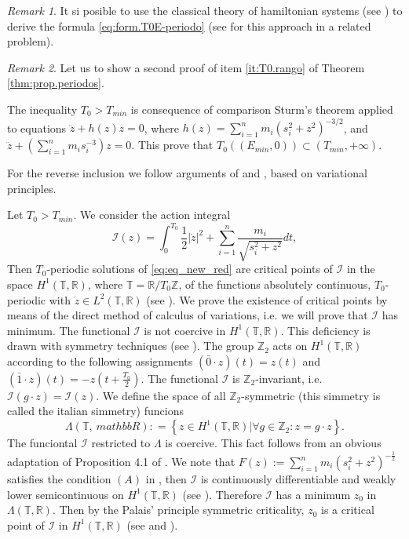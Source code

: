 \documentclass[twoside]{article}
\theoremstyle{remark}
\newtheorem{comentario}{Remark}
\newcommand{\rr}{\mathbb{R}}
\begin{document}
\begin{comentario}
 It si posible to use the classical theory of hamiltonian systems (see \cite{A}) to derive the formula \eqref{eq:form.T0E-periodo} (see \cite{acinas2014estimates} for this approach in a related problem).
\end{comentario}



\begin{comentario}
Let us to show a second proof of item \ref{it:T0.rango} of Theorem \ref{thm:prop.periodos}.

The inequality $T_0>T_{min}$ is consequence of comparison Sturm's theorem applied to equations  $\ddot{z}+h(z)z=0$, where $h(z)=\sum_{i=1}^{n} m_i \left(s_i^2 +z^2\right)^{-3/2}$, and $\ddot{z}+\left(\sum_{i=1}^{n} m_i s_i^{-3}\right)z=0$. This prove that $T_0\left((E_{min},0)\right)\subset(T_{min},+\infty)$.

For the reverse inclusion  we  follow arguments of \cite{zhao2015nonplanar} and \cite{li2013characterization}, based on variational principles.


Let $T_0>T_{min}$. We consider the action integral
\[\mathcal{I}(z)=\int_0^{T_0}\frac12|\dot{z}|^2+\sum_{i=1}^n\frac{m_i}{\sqrt{s_i^2+z^2}}dt,\]
Then $T_0$-periodic solutions of \eqref{eq:eq_new_red} are critical points of $\mathcal{I}$ in the space $H^1(\mathbb{T},\rr)$, where $\mathbb{T}=\rr/T_0\mathbb{Z}$, of the functions  absolutely continuous, $T_0$-periodic with $\dot{z}\in L^2(\mathbb{T},\rr)$ (see \cite[Cor. 1.1]{Mawhin2010}). We prove the existence of critical points by means of the direct method of calculus of variations, i.e. we will prove that $\mathcal{I}$ has minimum.  The functional $\mathcal{I}$ is not coercive in $H^1(\mathbb{T},\rr)$.  This deficiency is drawn with symmetry techniques (see \cite{David-2004}). The group $\mathbb{Z}_2$ acts on $H^1(\mathbb{T},\rr)$ according to the following assignments $(\bar{0}\cdot z)(t)=z(t)$ and $(\bar{1}\cdot z)(t)=-z(t+\frac{T_0}{2})$. The functional $\mathcal{I}$ is $\mathbb{Z}_2$-invariant, i.e. $\mathcal{I}(g\cdot z)=\mathcal{I}(z)$. We define the space of all $\mathbb{Z}_2$-symmetric (this simmetry is called the italian simmetry) funcions \[\Lambda(\mathbb{T},\
mathbb{R}):
=\left\{ z\in H^1(\mathbb{T},\rr) | \forall g\in \mathbb{Z}_2 : z=g\cdot z \right\}.\]
The funciontal $\mathcal{I}$ restricted to $\Lambda$  is coercive. This fact follows from an obvious adaptation of Proposition 4.1 of \cite{David-2004}. We note that $F(z):=\sum_{i=1}^nm_i(s_i^2+z^2)^{-\frac{1}{2}}$ satisfies the condition $(A)$ in \cite[p. 12]{Mawhin2010}, then $\mathcal{I}$  is continuously differentiable and weakly lower semicontinuous on $H^1(\mathbb{T},\rr)$ (see \cite[p. 13]{Mawhin2010}). Therefore $\mathcal{I}$ has a minimum $z_0$ in $\Lambda(\mathbb{T},\mathbb{R})$. Then by the Palais' principle symmetric criticality,  $z_0$ is a critical point of $\mathcal{I}$ in $H^1(\mathbb{T},\rr)$ (see \cite{David-2004} and \cite{RichardPalais274}).


\end{comentario}
\end{document}
